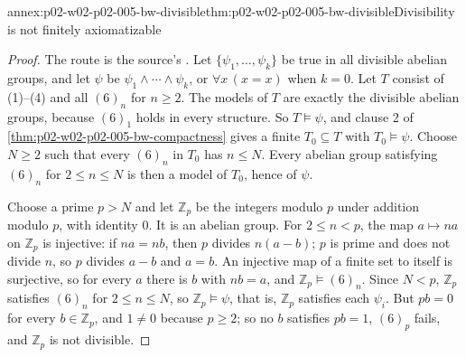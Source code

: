 \begin{annexitem}{annex:p02-w02-p02-005-bw-divisible}{thm:p02-w02-p02-005-bw-divisible}{Divisibility is not finitely axiomatizable}
\begin{proof}
The route is the source's \cite[ch.~A.1, \S2, pp.~10--11]{Barwise1977FirstOrder}.
Let \(\{\psi_1,\ldots,\psi_k\}\) be true in all divisible abelian groups,
and let \(\psi\) be \(\psi_1\land\cdots\land\psi_k\), or
\(\forall x\,(x=x)\) when \(k=0\).  Let \(T\) consist of (1)--(4) and all
\((6)_n\) for \(n\geq2\).  The models of \(T\) are exactly the divisible
abelian groups, because \((6)_1\) holds in every structure.  So
\(T\models\psi\), and clause 2 of
\cref{thm:p02-w02-p02-005-bw-compactness} gives a finite
\(T_0\subseteq T\) with \(T_0\models\psi\).  Choose \(N\geq2\) such that
every \((6)_n\) in \(T_0\) has \(n\leq N\).  Every abelian group satisfying
\((6)_n\) for \(2\leq n\leq N\) is then a model of \(T_0\), hence of
\(\psi\).

Choose a prime \(p>N\) and let \(\mathbb Z_p\) be the integers modulo
\(p\) under addition modulo \(p\), with identity \(0\).  It is an abelian
group.  For \(2\leq n<p\), the map \(a\mapsto na\) on \(\mathbb Z_p\) is
injective: if \(na=nb\), then \(p\) divides \(n(a-b)\); \(p\) is prime and
does not divide \(n\), so \(p\) divides \(a-b\) and \(a=b\).  An injective
map of a finite set to itself is surjective, so for every \(a\) there is
\(b\) with \(nb=a\), and \(\mathbb Z_p\models(6)_n\).  Since \(N<p\),
\(\mathbb Z_p\) satisfies \((6)_n\) for \(2\leq n\leq N\), so
\(\mathbb Z_p\models\psi\), that is, \(\mathbb Z_p\) satisfies each
\(\psi_i\).  But \(pb=0\) for every \(b\in\mathbb Z_p\), and \(1\neq0\)
because \(p\geq2\); so no \(b\) satisfies \(pb=1\), \((6)_p\) fails, and
\(\mathbb Z_p\) is not divisible.
\end{proof}
\end{annexitem}

